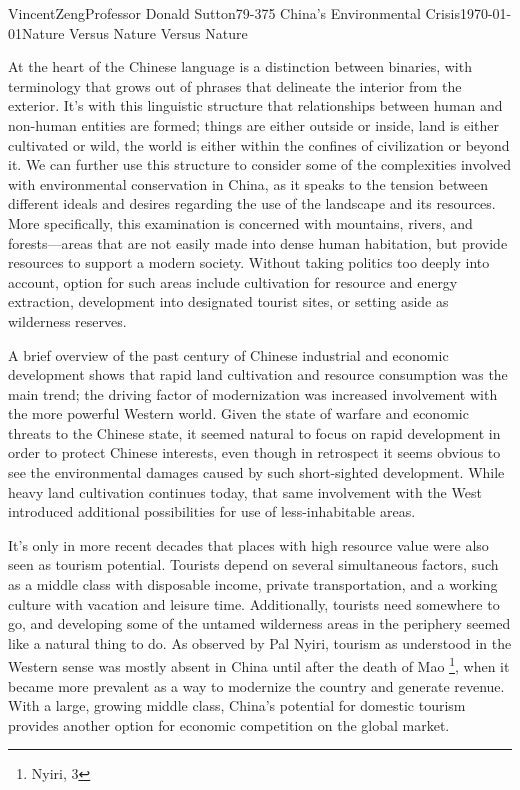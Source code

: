 \documentclass[12pt]{article}
\begin{document}
\begin{mla}{Vincent}{Zeng}{Professor Donald Sutton}{79-375 China's Environmental Crisis}{\today}{Nature Versus Nature Versus Nature}

At the heart of the Chinese language is a distinction between binaries, with
terminology that grows out of phrases that delineate the interior from the
exterior. It's with this linguistic structure that relationships between human
and non-human entities are formed; things are either outside or inside, land is
either cultivated or wild, the world is either within the confines of
civilization or beyond it. We can further use this structure to consider some
of the complexities involved with environmental conservation in China, as it
speaks to the tension between different ideals and desires regarding the use of
the landscape and its resources. More specifically, this examination is
concerned with mountains, rivers, and forests---areas that
are not easily made into dense human habitation, but provide resources to
support a modern society. Without taking politics too deeply into account, 
option for such areas include cultivation for resource and energy extraction, development
into designated tourist sites, or setting aside as wilderness reserves.

A brief overview of the past century of Chinese industrial and economic
development shows that rapid land cultivation and resource consumption was the
main trend; the driving factor of modernization was increased involvement with
the more powerful Western world. Given the state of warfare and economic threats
to the Chinese state, it seemed natural to focus on rapid development in order
to protect Chinese interests, even though in retrospect it seems obvious to see
the environmental damages caused by such short-sighted development. While heavy
land cultivation continues today, that same involvement with the West introduced
additional possibilities for use of less-inhabitable areas.

It's only in more recent decades that places with high resource value were also
seen as tourism potential. Tourists depend on several simultaneous factors,
such as a middle class with disposable income, private transportation, and a
working culture with vacation and leisure time. Additionally, tourists need
somewhere to go, and developing some of the untamed wilderness areas in the
periphery seemed like a natural thing to do. As observed by Pal Nyiri, tourism
as understood in the Western sense was mostly absent in China until after the
death of Mao \footnote{Nyiri, 3}, when it became more prevalent as a way to
modernize the country and generate revenue. With a large, growing middle class,
China's potential for domestic tourism provides another option for economic
competition on the global market.


\end{mla}
\end{document}
